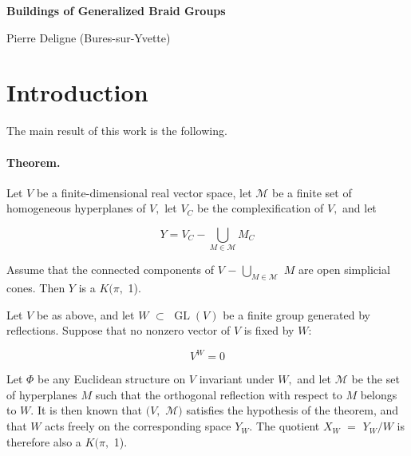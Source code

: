 \documentclass[10pt,a4paper]{article}
\begin{document}
\begin{center}\LARGE\bfseries Buildings of Generalized Braid Groups\end{center}

\begin{center}\large Pierre Deligne (Bures-sur-Yvette)\end{center}

\section*{Introduction}

The main result of this work is the following.\par

\paragraph{Theorem.} Let \ensuremath{V} be a finite-dimensional real vector space, let \ensuremath{\mathcal{M}} be a finite set of homogeneous hyperplanes of \ensuremath{V,} let \ensuremath{V_C} be the complexification of \ensuremath{V,} and let

\[
Y = V_C - \bigcup_{M\in{}\mathcal{M}} M_C
\]

Assume that the connected components of \ensuremath{V} \ensuremath{-} \ensuremath{\bigcup_{M\in{}\mathcal{M}}} \ensuremath{M} are open simplicial cones. Then \ensuremath{Y} is a \ensuremath{K(\pi{},} 1).\par

Let \ensuremath{V} be as above, and let \ensuremath{W} \ensuremath{\subset{}} \ensuremath{\operatorname{GL}(V)} be a finite group generated by reflections. Suppose that no nonzero vector of \ensuremath{V} is fixed by \ensuremath{W:}\par

\[
V^W = 0
\]

Let \ensuremath{\Phi{}} be any Euclidean structure on \ensuremath{V} invariant under \ensuremath{W,} and let \ensuremath{\mathcal{M}} be the set of hyperplanes \ensuremath{M} such that the orthogonal reflection with respect to \ensuremath{M} belongs to \ensuremath{W.} It is then known that \ensuremath{(V,} \ensuremath{\mathcal{M})} satisfies the hypothesis of the theorem, and that \ensuremath{W} acts freely on the corresponding space \ensuremath{Y_W.} The quotient \ensuremath{X_W} \ensuremath{=} \ensuremath{Y_W/W} is therefore also a \ensuremath{K(\pi{},} 1).\par
\end{document}
